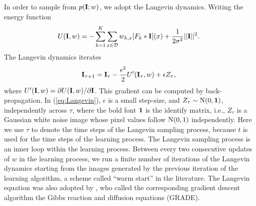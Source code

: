 \documentclass[letterpaper]{article}
\def\I{{\bf I}}
\begin{document}
In order to sample from $p(\I; w)$, we adopt the Langevin dynamics. Writing the energy function 
\begin{eqnarray}
   U(\I, w) = - \sum_{k=1}^{K} \sum_{x \in {\cal D}} w_{k, x} [F_k*\I](x) +  \frac{1}{2\sigma^2} ||\I||^2.
   \label{eq:energy}
\end{eqnarray}
The Langevin dynamics iterates 
\begin{eqnarray}
     \I_{\tau+1} = \I_{\tau} - \frac{\epsilon^2}{2}  U'(\I_\tau, w) + \epsilon Z_\tau, 
     \label{eq:Langevin}
\end{eqnarray}
where $U'(\I, w) = \partial U(\I, w)/\partial \I$. This gradient can be computed by back-propagation. In (\ref{eq:Langevin}), $\epsilon$ is a small step-size, and $Z_\tau \sim {\rm N}(0, {\bf 1})$, independently across $\tau$, where the bold font ${\bf 1}$ is the identify matrix, i.e., $Z_\tau$ is a Gaussian white noise image whose pixel values follow ${\rm N}(0, 1)$ independently. Here we use $\tau$ to denote the time steps of the Langevin sampling process, because $t$ is used for the time steps of the learning process. The Langevin sampling process is an inner loop within the learning process. Between every two consecutive updates of $w$ in the learning process,  we run a finite number of iterations of the Langevin dynamics starting from the images generated by the previous iteration of the learning algorithm, a scheme called ``warm start'' in the literature. The Langevin equation was also adopted by \cite{zhu1997GRADE}, who called the corresponding gradient descent algorithm the Gibbs reaction and diffusion equations (GRADE).  
\end{document}
